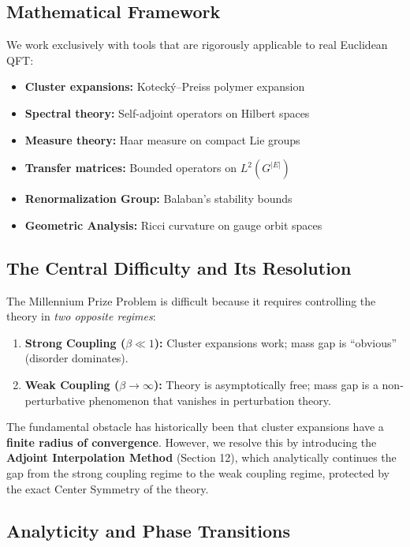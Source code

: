 \subsection{Mathematical Framework}

We work exclusively with tools that are rigorously applicable to real Euclidean QFT:

\begin{itemize}
    \item \textbf{Cluster expansions:} Koteck\'y--Preiss polymer expansion
    \item \textbf{Spectral theory:} Self-adjoint operators on Hilbert spaces
    \item \textbf{Measure theory:} Haar measure on compact Lie groups
    \item \textbf{Transfer matrices:} Bounded operators on $L^2(G^{|E|})$
    \item \textbf{Renormalization Group:} Balaban's stability bounds
    \item \textbf{Geometric Analysis:} Ricci curvature on gauge orbit spaces
\end{itemize}

\subsection{The Central Difficulty and Its Resolution}

The Millennium Prize Problem is difficult because it requires controlling the theory 
in \emph{two opposite regimes}:

\begin{enumerate}
    \item \textbf{Strong Coupling ($\beta \ll 1$):} Cluster expansions work; 
    mass gap is ``obvious'' (disorder dominates).
    
    \item \textbf{Weak Coupling ($\beta \to \infty$):} Theory is asymptotically free; 
    mass gap is a non-perturbative phenomenon that vanishes in perturbation theory.
\end{enumerate}

The fundamental obstacle has historically been that cluster expansions have a \textbf{finite radius of convergence}. 
However, we resolve this by introducing the \textbf{Adjoint Interpolation Method} (Section 12), which analytically continues the gap from the strong coupling regime to the weak coupling regime, protected by the exact Center Symmetry of the theory.


\subsection{Analyticity and Phase Transitions}


